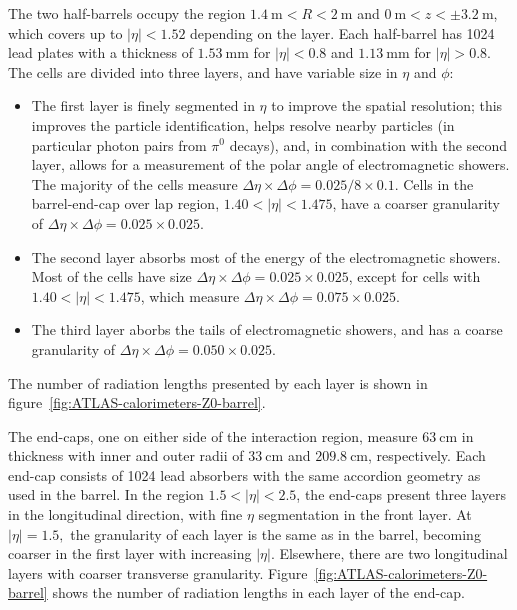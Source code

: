 The two half-barrels occupy the region $\SI{1.4}{\meter}<R<\SI{2}{\meter}$ and $\SI{0}{\meter}<z<\pm\SI{3.2}{\meter}$, which covers up to $|\eta|<1.52$ depending on the layer. Each half-barrel has 1024 lead plates with a thickness of $\SI{1.53}{\milli\meter}$ for $|\eta|<0.8$ and $\SI{1.13}{\milli\meter}$ for $|\eta|>0.8$. The cells are divided into three layers, and have variable size in $\eta$ and $\phi$:

\begin{itemize}
	\item The first layer is finely segmented in $\eta$ to improve the spatial resolution; this improves the particle identification, helps resolve nearby particles (in particular photon pairs from $\pi^0$ decays), and, in combination with the second layer, allows for a measurement of the polar angle of electromagnetic showers. The majority of the cells measure $\Delta\eta\times\Delta\phi=0.025/8\times0.1$. Cells in the barrel-end-cap over lap region, $1.40<|\eta|<1.475$, have a coarser granularity of $\Delta\eta\times\Delta\phi=0.025\times0.025$.

	\item The second layer absorbs most of the energy of the electromagnetic showers. Most of the cells have size $\Delta\eta\times\Delta\phi=0.025\times0.025$, except for cells with $1.40<|\eta|<1.475$, which measure $\Delta\eta\times\Delta\phi=0.075\times0.025$.

	\item The third layer aborbs the tails of electromagnetic showers, and has a coarse granularity of $\Delta\eta\times\Delta\phi=0.050\times0.025$.
\end{itemize}



The number of radiation lengths presented by each layer is shown in figure~\ref{fig:ATLAS-calorimeters-Z0-barrel}. 

The end-caps, one on either side of the interaction region, measure $\SI{63}{\centi\meter}$ in thickness with inner and outer radii of $\SI{33}{\centi\meter}$ and $\SI{209.8}{\centi\meter}$, respectively. 
Each end-cap consists of 1024 lead absorbers with the same accordion geometry as used in the barrel. In the region $1.5<|\eta|<2.5$, the end-caps present three layers in the longitudinal direction, with fine $\eta$ segmentation in the front layer. At $|\eta|=1.5,$ the granularity of each layer is the same as in the barrel, becoming coarser in the first layer with increasing $|\eta|$. Elsewhere, there are two longitudinal layers with coarser transverse granularity. Figure~\ref{fig:ATLAS-calorimeters-Z0-barrel} shows the number of radiation lengths in each layer of the end-cap.

